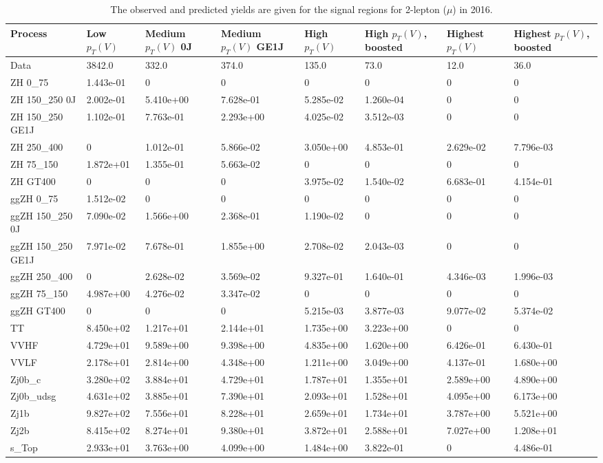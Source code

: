 \begin{table}
\centering
\caption[2016 2-lepton ($\mu$) signal selection yields]{
                  The observed and predicted yields are given for the
                  signal regions for 2-lepton ($\mu$) in 2016.
                  }
{\footnotesize
\begin{tabularx}{\textwidth}{|X|X|X|X|X|X|X|X|}
\hline
Process & Low $p_{T}(V)$ & Medium $p_{T}(V)$ 0J & Medium $p_{T}(V)$ GE1J & High $p_{T}(V)$ & High $p_{T}(V)$, boosted & Highest $p_{T}(V)$ & Highest $p_{T}(V)$, boosted \\
\hline
Data & 3842.0 & 332.0 & 374.0 & 135.0 & 73.0 & 12.0 & 36.0 \\
\hline
ZH 0\_75 & 1.443e-01 & 0 & 0 & 0 & 0 & 0 & 0 \\
ZH 150\_250 0J & 2.002e-01 & 5.410e+00 & 7.628e-01 & 5.285e-02 & 1.260e-04 & 0 & 0 \\
ZH 150\_250 GE1J & 1.102e-01 & 7.763e-01 & 2.293e+00 & 4.025e-02 & 3.512e-03 & 0 & 0 \\
ZH 250\_400 & 0 & 1.012e-01 & 5.866e-02 & 3.050e+00 & 4.853e-01 & 2.629e-02 & 7.796e-03 \\
ZH 75\_150 & 1.872e+01 & 1.355e-01 & 5.663e-02 & 0 & 0 & 0 & 0 \\
ZH GT400 & 0 & 0 & 0 & 3.975e-02 & 1.540e-02 & 6.683e-01 & 4.154e-01 \\
ggZH 0\_75 & 1.512e-02 & 0 & 0 & 0 & 0 & 0 & 0 \\
ggZH 150\_250 0J & 7.090e-02 & 1.566e+00 & 2.368e-01 & 1.190e-02 & 0 & 0 & 0 \\
ggZH 150\_250 GE1J & 7.971e-02 & 7.678e-01 & 1.855e+00 & 2.708e-02 & 2.043e-03 & 0 & 0 \\
ggZH 250\_400 & 0 & 2.628e-02 & 3.569e-02 & 9.327e-01 & 1.640e-01 & 4.346e-03 & 1.996e-03 \\
ggZH 75\_150 & 4.987e+00 & 4.276e-02 & 3.347e-02 & 0 & 0 & 0 & 0 \\
ggZH GT400 & 0 & 0 & 0 & 5.215e-03 & 3.877e-03 & 9.077e-02 & 5.374e-02 \\
\hline
TT & 8.450e+02 & 1.217e+01 & 2.144e+01 & 1.735e+00 & 3.223e+00 & 0 & 0 \\
VVHF & 4.729e+01 & 9.589e+00 & 9.398e+00 & 4.835e+00 & 1.620e+00 & 6.426e-01 & 6.430e-01 \\
VVLF & 2.178e+01 & 2.814e+00 & 4.348e+00 & 1.211e+00 & 3.049e+00 & 4.137e-01 & 1.680e+00 \\
Zj0b\_c & 3.280e+02 & 3.884e+01 & 4.729e+01 & 1.787e+01 & 1.355e+01 & 2.589e+00 & 4.890e+00 \\
Zj0b\_udsg & 4.631e+02 & 3.885e+01 & 7.390e+01 & 2.093e+01 & 1.528e+01 & 4.095e+00 & 6.173e+00 \\
Zj1b & 9.827e+02 & 7.556e+01 & 8.228e+01 & 2.659e+01 & 1.734e+01 & 3.787e+00 & 5.521e+00 \\
Zj2b & 8.415e+02 & 8.274e+01 & 9.380e+01 & 3.872e+01 & 2.588e+01 & 7.027e+00 & 1.208e+01 \\
s\_Top & 2.933e+01 & 3.763e+00 & 4.099e+00 & 1.484e+00 & 3.822e-01 & 0 & 4.486e-01 \\
\hline
\end{tabularx}
}
\label{tab:sr-Zmm-2016}
\end{table}

